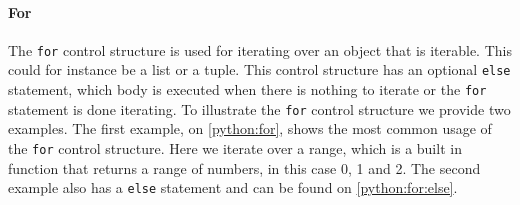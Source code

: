 \paragraph{For}
The \texttt{for} control structure is used for iterating over an object that is iterable.
This could for instance be a list or a tuple.
This control structure has an optional \texttt{else} statement, which body is executed when there is nothing to iterate or the \texttt{for} statement is done iterating.
To illustrate the \texttt{for} control structure we provide two examples.
The first example, on \cref{python:for}, shows the most common usage of the \texttt{for} control structure.
Here we iterate over a range, which is a built in function that returns a range of numbers, in this case 0, 1 and 2.
The second example also has a \texttt{else} statement and can be found on \cref{python:for:else}.


